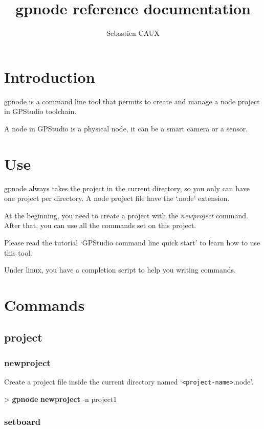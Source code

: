 \documentclass[10pt,a4paper]{article}
\author{Sebastien CAUX}
\title{gpnode reference documentation \version}
\begin{document}
\maketitle
\section{Introduction}
gpnode is a command line tool that permits to create and manage a node project in GPStudio toolchain.

A node in GPStudio is a physical node, it can be a smart camera or a sensor.

\section{Use}
gpnode always takes the project in the current directory, so you only can have one project per directory. A node project file have the `.node' extension.

At the beginning, you need to create a project with the \emph{newproject} command. After that, you can use all the commands set on this project.

Please read the tutorial `GPStudio command line quick start' to learn how to use this tool.

Under linux, you have a completion script to help you writing commands.

\section{Commands}
\subsection{project}
\subsubsection{newproject}

Create a project file inside the current directory named `\texttt{<project-name>}.node'.

\begin{sampletitle}
> \textbf{gpnode} \textbf{newproject} -n project1
\end{sampletitle}

\subsubsection{setboard}
\end{document}
